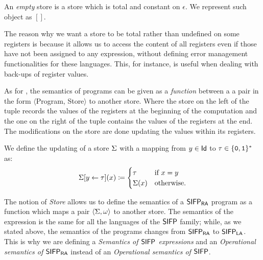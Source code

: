 \begin{defn}
An \emph{empty} store is a store which is total and constant on $\epsilon$. We represent such object as $[]$.
\end{defn}

The reason why we want a store to be total rather than undefined on some registers
is because it allows us to access the content of all registers even if
those have not been assigned to any expression, without defining error management
functionalities for these languages. This, for instance, is useful when dealing
with back-ups of register values.

As for \cite{winskel1993formal}, the semantics of programs can be
given as a \emph{function}
between a a pair in the form $\langle$Program, Store$\rangle$ to another store.
Where the store on the left of the tuple records the values of the registers at
the beginning of the computation and the one on the right of the tuple contains the values of the registers
at the end. The modifications on the store are done
updating the values within its registers.

\begin{defn}
We define the updating of a store $\Sigma$ with a mapping from $y \in \mathsf{Id}$ to $\tau \in \{\mathtt{0}, \mathtt{1}\}^*$ as:
\[
\Sigma[y\leftarrow \tau](x) \coloneqq \begin{cases} \tau & \text{if } x = y\\ \Sigma(x) & \text{otherwise.}\end{cases}
\]

\end{defn}

The notion of \emph{Store} allows us to define the semantics of
a $\mathsf{SIFP_{{\mathsf{RA}}}}$ program as a function which maps a pair $\langle \Sigma,\omega\rangle$
to another store.
%
%
The semantics of the expression is the same for all the languages of the
$\mathsf{SIFP}$ family;
while, as we stated above,
the semantics of the programs changes from $\mathsf{SIFP_{{\mathsf{RA}}}}$ to $\mathsf{SIFP_{{\mathsf{LA}}}}$.
This is why we are defining a \emph{Semantics of $\mathsf{SIFP}$ expressions} and an
\emph{Operational semantics of $\mathsf{SIFP_{{\mathsf{RA}}}}$} instead of an
\emph{Operational semantics of $\mathsf{SIFP}$}.

